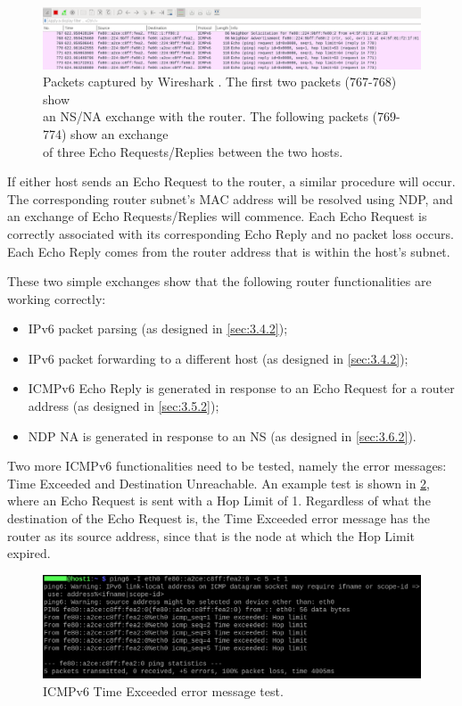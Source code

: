 \begin{figure}[htbp]
  \centering
    \includegraphics[width=1\textwidth]{figures/evaluation/wireshark.png}
     \caption{Packets captured by Wireshark \cite{Wireshark}. The first two packets (767-768) show \\ an NS/NA exchange with the router. The following packets (769-774) show an exchange \\ of three Echo Requests/Replies between the two hosts.}
     \label{fig:eval-wireshark}
\end{figure}

If either host sends an Echo Request to the router, a similar procedure will occur. The corresponding router subnet's MAC address will be resolved using NDP, and an exchange of Echo Requests/Replies will commence. Each Echo Request is correctly associated with its corresponding Echo Reply and no packet loss occurs. Each Echo Reply comes from the router address that is within the host’s subnet.

These two simple exchanges show that the following router functionalities are working correctly:
\begin{itemize}[topsep=0pt]
\item IPv6 packet parsing (as designed in \cref{sec:3.4.2});
\item IPv6 packet forwarding to a different host (as designed in \cref{sec:3.4.2});
\item ICMPv6 Echo Reply is generated in response to an Echo Request for a router address (as designed in \cref{sec:3.5.2});
\item NDP NA is generated in response to an NS (as designed in \cref{sec:3.6.2}).
\end{itemize}

Two more ICMPv6 functionalities need to be tested, namely the error messages: Time Exceeded and Destination Unreachable. An example test is shown in \cref{fig:eval-timeextest}, where an Echo Request is sent with a Hop Limit of 1. Regardless of what the destination of the Echo Request is, the Time Exceeded error message has the router as its source address, since that is the node at which the Hop Limit expired.
 
\begin{figure}[htbp]
  \centering
    \includegraphics[width=1\textwidth]{figures/evaluation/icmpv6_test2.png}
     \caption{ICMPv6 Time Exceeded error message test.}
     \label{fig:eval-timeextest}
\end{figure}

